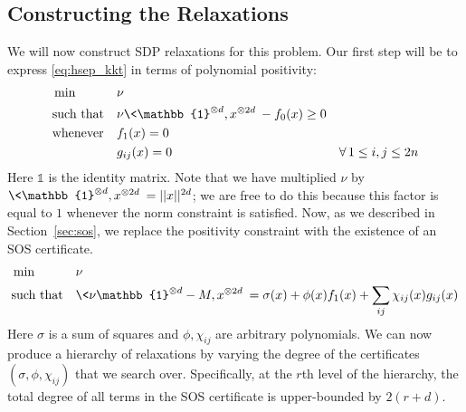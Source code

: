 \documentclass[aps,pra,notitlepage,preprintnumbers,11pt,tightenlines]{revtex4-1}
\newcommand{\ident}{\mathbb{1}}
\newcommand{\ot}{\otimes}
\begin{document}
\subsection{Constructing the Relaxations}
We will now construct SDP relaxations for this problem.
Our first step will be to express \eqref{eq:hsep_kkt} in terms of polynomial
positivity:
\[
\begin{aligned}
  &\min && \nu \\
  &\text{such that} &&  \nu 
\<\ident^{\otimes d}, x^{\ot 2d}\>- f_0(x) \geq 0\\
  &\text{whenever} && f_1(x)
  = 0 \\
  &&& g_{ij}(x) = 0 &
  \forall \, 1 \leq i, j \leq 2n
\end{aligned}
\]
Here $\ident$ is the identity matrix.
Note that we have multiplied $\nu$ by $\<\ident^{\otimes d}, x^{\ot 2d}\> =
||x||^{2d} $; we are free to do this because
this factor is equal to $1$ whenever the norm constraint is satisfied. 
Now, as we described in Section~\ref{sec:sos}, we replace the positivity constraint with
the existence of an SOS certificate.
\begin{equation}
\label{eq:hsep_kkt_sos}
\begin{aligned}
  &\min && \nu \\
  &\text{such that} && \<\nu \ident^{\otimes d} -M, x^{\ot 2d}\>=
  \sigma(x) + \phi(x) f_1(x) + \sum_{ij} \chi_{ij}(x) g_{ij}(x)\\
\end{aligned}
\end{equation}
Here $\sigma$ is a sum of squares and $\phi, \chi_{ij}$ are arbitrary
polynomials. We can now produce a hierarchy of relaxations by
varying the degree of the certificates $(\sigma, \phi, \chi_{ij})$ that we
search over. Specifically, at the $r$th level of the hierarchy, the
total degree of all terms in the SOS certificate is upper-bounded by
$2(r + d)$.
\end{document}
